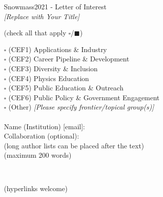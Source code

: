 \documentclass[11pt]{article}
\begin{document}
\begin{raggedright} 
\huge
Snowmass2021 - Letter of Interest \hfill \\[+1em]
\textit{[Replace with Your Title]} \hfill \\[+1em]
\end{raggedright}

\normalsize

  (check all that apply $\square$/$\blacksquare$)

\noindent $\square$ (CEF1) Applications \& Industry \\
\noindent $\square$ (CEF2) Career Pipeline \& Development \\ 
\noindent $\square$ (CEF3) Diversity \& Inclusion  \\
\noindent $\square$ (CEF4) Physics Education \\
\noindent $\square$ (CEF5) Public Education \& Outreach \\
\noindent $\square$ (CEF6) Public Policy \& Government Engagement \\
\noindent $\square$ (Other) {\it [Please specify frontier/topical group(s)]} \\

\\
Name (Institution) [email]: \\
Collaboration (optional): \\

 (long author lists can be placed after the text) \\[+1em]

 (maximum 200 words)

\clearpage


\clearpage
~
\clearpage

 (hyperlinks welcome) \\

\vspace{3.5in}

\\
\end{document}

